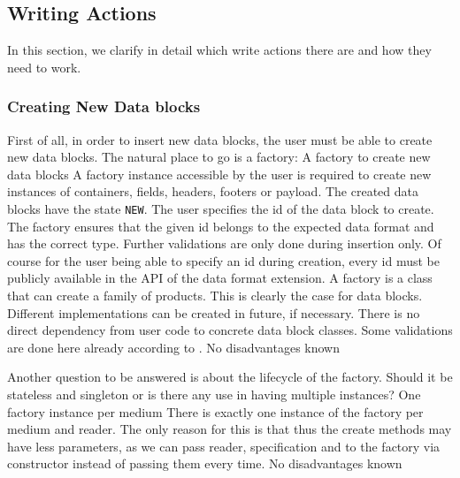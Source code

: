 \subsection{Writing Actions}%
\label{sec:WritingActions}%

In this section, we clarify in detail which write actions there are and how they need to work.

\subsubsection{Creating New Data blocks}%
\label{sec:CreatingNewDatablocks}%

First of all, in order to insert new data blocks, the user must be able to create new data blocks. The natural place to go is a factory:
{%
A factory to create new data blocks
}
{%
A factory instance accessible by the user is required to create new instances of containers, fields, headers, footers or payload. The created data blocks have the state \texttt{NEW}. The user specifies the id of the data block to create. The factory ensures that the given id belongs to the expected data format and has the correct type. Further validations are only done during insertion only. Of course for the user being able to specify an id during creation, every id must be publicly available in the API of the data format extension.
}
{%
A factory is a class that can create a family of products. This is clearly the case for data blocks. Different implementations can be created in future, if necessary. There is no direct dependency from user code to concrete data block classes. Some validations are done here already according to .
}
{%
No disadvantages known
}

Another question to be answered is about the lifecycle of the factory. Should it be stateless and singleton or is there any use in having multiple instances?
{%
One factory instance per medium
}
{%
There is exactly one instance of the factory per medium and reader.
}
{%
The only reason for this is that thus the create methods may have less parameters, as we can pass reader, specification and \IMediumStore{} to the factory via constructor instead of passing them every time.
}
{%
No disadvantages known
}

